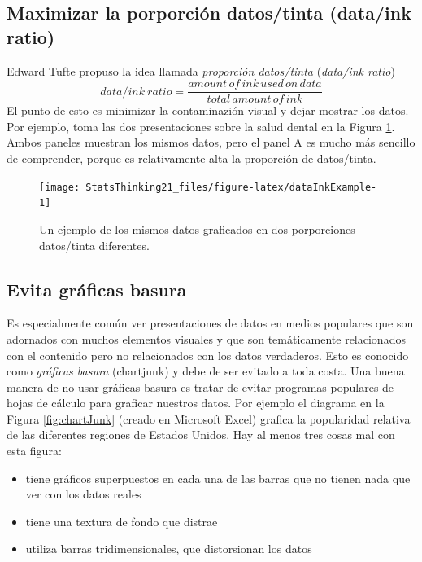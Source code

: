 \documentclass[
  12pt,
]{book}
\providecommand{\tightlist}{%
  \setlength{\itemsep}{0pt}\setlength{\parskip}{0pt}}
\begin{document}
\hypertarget{maximizar-la-porporciuxf3n-datostinta-dataink-ratio}{%
\subsection{Maximizar la porporción datos/tinta (data/ink ratio)}\label{maximizar-la-porporciuxf3n-datostinta-dataink-ratio}}

Edward Tufte propuso la idea llamada \emph{proporción datos/tinta} (\emph{data/ink ratio})
\[
data/ink\ ratio = \frac{amount\, of\, ink\, used\, on\, data}{total\, amount\, of\, ink}
\]
El punto de esto es minimizar la contaminazión visual y dejar mostrar los datos. Por ejemplo, toma las dos presentaciones sobre la salud dental en la Figura \ref{fig:dataInkExample}. Ambos paneles muestran los mismos datos, pero el panel A es mucho más sencillo de comprender, porque es relativamente alta la proporción de datos/tinta.

\begin{figure}
\texttt{[image: StatsThinking21\_files/figure-latex/dataInkExample-1]} \caption{Un ejemplo de los mismos datos graficados en dos porporciones datos/tinta diferentes.}\label{fig:dataInkExample}
\end{figure}

\hypertarget{evita-gruxe1ficas-basura}{%
\subsection{Evita gráficas basura}\label{evita-gruxe1ficas-basura}}

Es especialmente común ver presentaciones de datos en medios populares que son adornados con muchos elementos visuales y que son temáticamente relacionados con el contenido pero no relacionados con los datos verdaderos. Esto es conocido como \emph{gráficas basura} (chartjunk) y debe de ser evitado a toda costa.
Una buena manera de no usar gráficas basura es tratar de evitar programas populares de hojas de cálculo para graficar nuestros datos. Por ejemplo el diagrama en la Figura \ref{fig:chartJunk} (creado en Microsoft Excel) grafica la popularidad relativa de las diferentes regiones de Estados Unidos.
Hay al menos tres cosas mal con esta figura:

\begin{itemize}
\tightlist
\item
  tiene gráficos superpuestos en cada una de las barras que no tienen nada que ver con los datos reales
\item
  tiene una textura de fondo que distrae
\item
  utiliza barras tridimensionales, que distorsionan los datos
\end{itemize}
\end{document}
